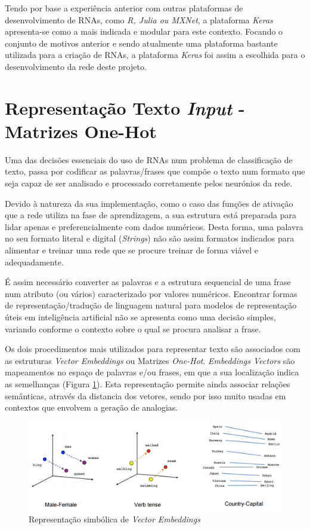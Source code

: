 Tendo por base a experiência anterior com outras plataformas de desenvolvimento de RNAs, como \textit{R, Julia ou MXNet}, a plataforma \textit{Keras} apresenta-se como a mais indicada e modular para este contexto.
Focando o conjunto de motivos anterior e sendo atualmente uma plataforma bastante utilizada para a criação de RNAs, a plataforma \textit{Keras} foi assim a escolhida para o desenvolvimento da rede deste projeto. 


\section{Representação Texto \textit{Input} - Matrizes One-Hot}
\label{sec:vectPalavras}

Uma das decisões essenciais do uso de RNAs num problema de classificação de texto, passa por codificar as palavras/frases que compõe o texto num formato que seja capaz de ser analisado e processado corretamente pelos neurónios da rede. 

Devido à natureza da sua implementação, como o caso das funções de ativação que a rede utiliza na fase de aprendizagem, a sua estrutura está preparada para lidar apenas e preferencialmente com dados numéricos. Desta forma, uma palavra no seu formato literal e digital (\textit{Strings}) não são assim formatos indicados para alimentar e treinar uma rede que se procure treinar de forma viável e adequadamente. 

É assim necessário converter as palavras e a estrutura sequencial de uma frase num atributo (ou vários) caracterizado por valores numéricos. 
Encontrar formas de representação/tradução de linguagem natural para modelos de representação úteis em inteligência artificial não se apresenta como uma decisão simples, variando conforme o contexto sobre o qual se procura analisar a frase. 

Os dois procedimentos mais utilizados para representar texto são associados com as estruturas \textit{Vector Embeddings} ou Matrizes \textit{One-Hot}. 
\textit{Embeddings Vectors} são mapeamentos no espaço de palavras e/ou frases, em que a sua localização indica as semelhanças (Figura \ref{fig:vectorEmbeddings}). Esta representação permite ainda associar relações semânticas, através da distancia dos vetores, sendo por isso muito usadas em contextos que envolvem a geração de analogias.

\begin{figure}[H]
    \hspace{-0.2in}
    \includegraphics[scale=0.3]{Imagens/vector_embeddings.png}
    \caption{Representação simbólica de \textit{Vector Embeddings}}
    \label{fig:vectorEmbeddings}
\end{figure}


